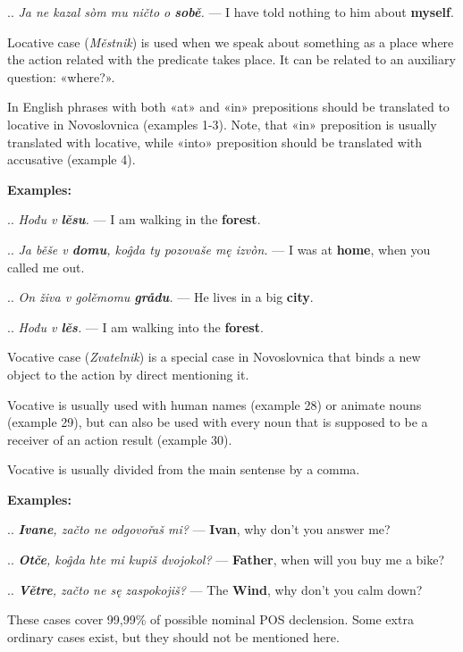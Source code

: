 .. \textit{Ja ne kazal sòm mu ničto o \textbf{sobě}.} — I have told nothing to him about \textbf{myself}.

Locative case (\textit{Městnik}) is used when we speak about something as a place where the action related with the predicate takes place. It can be related to an auxiliary question: «where?».

In English phrases with both «at» and «in» prepositions should be translated to locative in Novoslovnica (examples 1-3). Note, that «in» preposition is usually translated with locative, while «into» preposition should be translated with accusative (example 4).

\textbf{Examples:}

.. \textit{Hođu v \textbf{lěsu}.} — I am walking in the \textbf{forest}.

.. \textit{Ja běše v \textbf{domu}, koĝda ty pozovaše mę izvòn.} — I was at \textbf{home}, when you called me out.

.. \textit{On živa v golěmomu \textbf{grådu}.} — He lives in a big \textbf{city}.

.. \textit{Hođu v \textbf{lěs}.} — I am walking into the \textbf{forest}.

Vocative case (\textit{Zvatelnik}) is a special case in Novoslovnica that binds a new object to the action by direct mentioning it.

Vocative is usually used with human names (example 28) or animate nouns (example 29), but can also be used with every noun that is supposed to be a receiver of an action result (example 30).

Vocative is usually divided from the main sentense by a comma.

\textbf{Examples:}

.. \textit{\textbf{Ivane}, začto ne odgovořaš mi?} — \textbf{Ivan}, why don't you answer me?

.. \textit{\textbf{Otče}, koĝda hte mi kupiš dvojokol?} — \textbf{Father}, when will you buy me a bike?

.. \textit{\textbf{Větre}, začto ne sę zaspokojiš?} — The \textbf{Wind}, why don't you calm down?

These cases cover 99,99\% of possible nominal POS declension. Some extra ordinary cases exist, but they should not be mentioned here.


